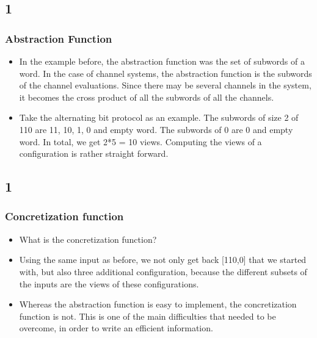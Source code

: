 \documentclass[handout]{beamer}
\begin{document}
\begin{footnotesize}
\subsection*{1}
\begin{frame}
  \frametitle{Abstraction Function}
  \begin{itemize}
  \item
  In the example before, the abstraction function was the set of subwords of a word. In the case of channel systems, the abstraction function is the subwords of the channel evaluations. Since there may be several channels in the system, it becomes the cross product of all the subwords of all the channels.
\item
  Take the alternating bit protocol as an example. The subwords of size 2 of 110 are 11, 10, 1, 0 and empty word. The subwords of 0 are 0 and empty word. In total, we get 2*5 = 10 views. Computing the views of a configuration is rather straight forward.

    \end{itemize}
\end{frame}

\subsection*{1}
\begin{frame}
  \frametitle{Concretization function}
  \begin{itemize}
  \item
    What is the concretization function?
  \item
  Using the same input as before, we not only get back [110,0] that we started with, but also three additional configuration, because the different subsets of the inputs are the views of these configurations.
\item
Whereas the abstraction function is easy to implement, the concretization function is not.   This is one of the main difficulties that needed to be overcome, in order to write an efficient information.

  \end{itemize}
\end{frame}



\end{footnotesize}
\end{document}
